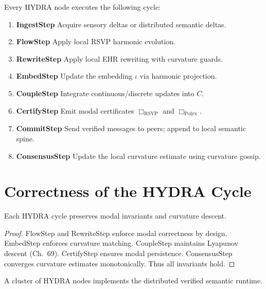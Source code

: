 Every HYDRA node executes the following cycle:

\begin{enumerate}
\item \textbf{IngestStep}  
      Acquire sensory deltas or distributed semantic deltas.

\item \textbf{FlowStep}  
      Apply local RSVP harmonic evolution.

\item \textbf{RewriteStep}  
      Apply local EHR rewriting with curvature guards.

\item \textbf{EmbedStep}  
      Update the embedding $\iota$ via harmonic projection.

\item \textbf{CoupleStep}  
      Integrate continuous/discrete updates into $C$.

\item \textbf{CertifyStep}  
      Emit modal certificates $\Box_{\mathrm{RSVP}}$ and $\Box_{\mathrm{Polyx}}$.

\item \textbf{CommitStep}  
      Send verified messages to peers; append to local semantic spine.

\item \textbf{ConsensusStep}  
      Update the local curvature estimate using curvature gossip.
\end{enumerate}

\section{Correctness of the HYDRA Cycle}

\begin{theorem}
Each HYDRA cycle preserves modal invariants and curvature descent.
\end{theorem}

\begin{proof}
FlowStep and RewriteStep enforce modal correctness by design.  
EmbedStep enforces curvature matching.  
CoupleStep maintains Lyapunov descent (Ch.~69).  
CertifyStep ensures modal persistence.  
ConsensusStep converges curvature estimates monotonically.  
Thus all invariants hold.
\end{proof}

\begin{theorem}
A cluster of HYDRA nodes implements the distributed verified semantic runtime.
\end{theorem}

